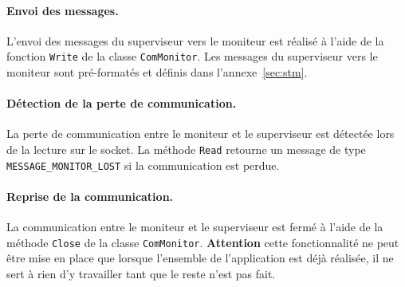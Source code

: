

\paragraph{Envoi des messages.} L'envoi des messages du superviseur vers le moniteur est réalisé à l'aide de la fonction {\tt Write} de la classe {\tt ComMonitor}. Les messages du superviseur vers le moniteur sont pré-formatés et définis dans l'annexe~\ref{sec:stm}.\\


\paragraph{Détection de la perte de communication.} La perte de communication entre le moniteur et le superviseur est détectée lors de la lecture sur le socket. La méthode {\tt Read} retourne un message de type {\tt MESSAGE\_MONITOR\_LOST}  si la communication est perdue. \\


\paragraph{Reprise de la communication.}  La communication entre le moniteur et le superviseur est fermé à l'aide de la méthode {\tt Close} de la classe {\tt ComMonitor}. {\bf Attention} cette fonctionnalité ne peut être mise en place que lorsque l'ensemble de l'application est déjà réalisée, il ne sert à rien d'y travailler tant que le reste n'est pas fait.\\


